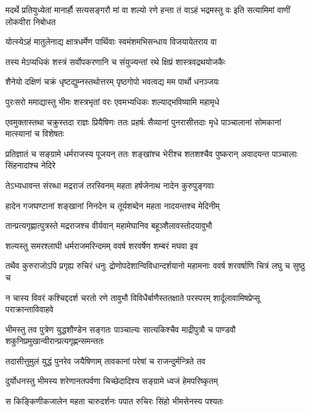 \threelineshloka
{मदर्थे प्रतियुध्येतां मानार्हौ सत्यसङ्गरौ}
{मां वा शल्यो रणे हन्ता तं वाऽहं भद्रमस्तु वः}
{इति सत्यामिमां वाणीं लोकवीरा निबोधत}


\twolineshloka
{योत्स्येऽहं मातुलेनाद्य क्षात्रधर्मेण पार्थिवाः}
{स्वमंशमभिसन्धाय विजयायेतराय वा}


\twolineshloka
{तस्य मेऽप्यधिकं शस्त्रं सर्वोपकरणानि च}
{संयुज्यन्तां रथे क्षिप्रं शास्त्रवद्रथयोजकैः}


\twolineshloka
{शैनेयो दक्षिणं चक्रं धृष्टद्युम्नस्तथोत्तरम्}
{पृष्ठगोपो भवत्वद्य मम पार्थो धनञ्जयः}


\twolineshloka
{पुरःसरो ममाद्यास्तु भीमः शस्त्रभृतां वरः}
{एवमभ्यधिकः शल्याद्भविष्यामि महामृधे}


एवमुक्तास्तथा चक्रुस्तदा राज्ञः प्रियैषिणः
\twolineshloka
{ततः प्रहर्षः सैव्यानां पुनरासीत्तदाः मृधे}
{पाञ्चालानां सोमकानां मात्स्यानां च विशेषतः}


\threelineshloka
{प्रतिज्ञातं च सङ्ग्रामे धर्मराजस्य पूजयन्}
{ततः शङ्खांश्च भेरीश्च शतशश्चैव पुष्करान्}
{अवादयन्त पाञ्चालाः सिंहनादांश्च नेदिरे}


\twolineshloka
{तेऽभ्यधावन्त संरब्धा मद्रराजं तरस्विनम्}
{महता हर्षजेनाथ नादेन कुरुपुङ्गवाः}


\twolineshloka
{हादेन गजघण्टानां शङ्खानां निनदेन च}
{तूर्यशब्देन महता नादयन्तश्च मेदिनीम्}


\twolineshloka
{तान्प्रत्यगृह्णात्पुत्रस्ते मद्रराजश्च वीर्यवान्}
{महामेघानिव बहूञ्शैलावस्तोदयावुभौ}


\twolineshloka
{शल्यस्तु समरश्लाघी धर्मराजमरिन्दमम्}
{ववर्ष शरवर्षेण शम्बरं मघवा इव}


\threelineshloka
{तथैव कुरुराजोऽपि प्रगृह्य रुचिरं धनुः}
{द्रोणोपदेशान्विविधान्दर्शयानो महामनाः}
{ववर्ष शरवर्षाणि चित्रं लघु च सुष्ठु च}


न चास्य विवरं कश्चिद्ददर्श चरतो रणे
\twolineshloka
{तावुभौ विविधैर्बाणैस्ततक्षाते परस्परम्}
{शार्दूलावामिषप्रेप्सू पराक्रान्ताविवाहवे}


भीमस्तु तव पुत्रेण युद्धशौण्डेन सङ्गतः
\twolineshloka
{पाञ्चाल्यः सात्यकिश्चैव माद्रीपुत्रौ च पाण्डवौ}
{शकुनिप्रमुखान्वीरान्प्रत्यगृह्णन्समन्ततः}


\twolineshloka
{तदासीत्तुमुलं युद्धं पुनरेव जयैषिणाम्}
{तावकानां परेषां च राजन्दुर्मन्त्रिते तव}


\twolineshloka
{दुर्योधनस्तु भीमस्य शरेणानतपर्वणा}
{चिच्छेदादिश्य सङ्ग्रामे ध्वजं हेमपरिष्कृतम्}


\twolineshloka
{स किङ्किणीकजालेन महता चारुदर्शनः}
{पपात रुचिरः सिंहो भीमसेनस्य पश्यतः}



